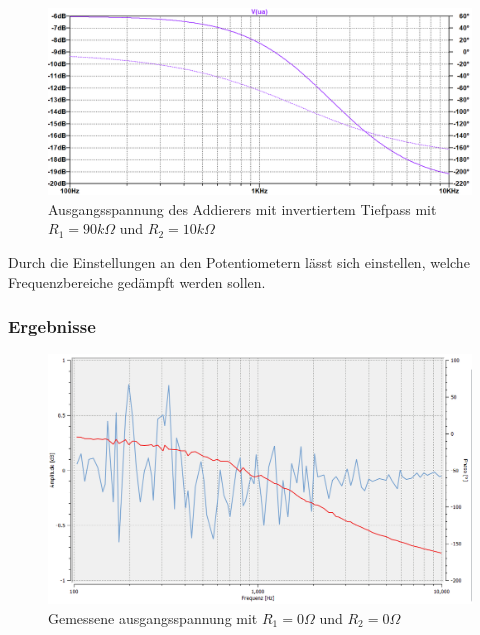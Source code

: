 \begin{figure}[htb]
    \includegraphics[width=16cm]{./pictures/Gesamtschaltung_Invertiert_90_10}
    \caption{Ausgangsspannung des Addierers mit invertiertem Tiefpass mit $R_1 = 90k\Omega$ und $R_2 = 10k\Omega$}
    \label{fig:AddiererAusgangsspannungInvertiert}
\end{figure}

Durch die Einstellungen an den Potentiometern lässt sich einstellen, welche Frequenzbereiche gedämpft werden sollen.

\newpage
\subsubsection{Ergebnisse}

\begin{figure}[htb]
    \includegraphics[width=16cm]{./pictures/Messungen/Gesamtschaltung_Test_0_0}
    \caption{Gemessene ausgangsspannung mit $R_1 = 0\Omega$ und $R_2 = 0\Omega$}
    \label{fig:Gesamtschaltung_Test_0_0}
\end{figure}

